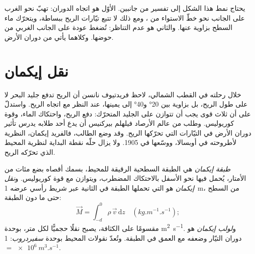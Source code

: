 يحتاج نمط هذا الشكل إلى تفسير من جانبين. الأوّل هو اتجاه الدوران: تهبّ  نحو الغرب على الجانب نحو خطّ الاستواء من ، ومع ذلك لا تتبع تيّارات  الريح ببساطة، ويتحرّك ماء السطح بزاوية عنها. والثاني هو عدم التناظر: تُضغط عودة  على الجانب الغربي من حوضها. وكلاهما يأتي من دوران الأرض.

\section{نقل إيكمان}\label{sec:b1:ocean-circulation:ekman}

\begin{history}
خلال رحلته في القطب الشمالي، لاحظ فريدتيوف نانسن أن الريح تدفع جليد البحر لا على طول الريح، بل بزاوية بين \ang{20} و\ang{40} إلى يمينها، عند النظر مع اتجاه الريح. واستدلّ على أن ثلاث قوى يجب أن تتوازن على الجليد المتحرّك: دفع الريح، واحتكاك الماء، وقوة كوريوليس. وطلب من عالم الأرصاد فيلهلم بيركنيس أن يدع أحد طلابه يدرس تأثير دوران الأرض في التيّارات التي تحرّكها الريح. وقد وضع الطالب، فالفريد إيكمان، النظرية لأطروحته في أوبسالا، ووسّعها في 1905. ولا يزال حلّه نقطة البداية لنظرية المحيط الذي تحرّكه الريح.
\end{history}

\begin{definition}\label{def:b1:ocean-circulation:ekman}
\emph{طبقة إيكمان} هي الطبقة السطحية الرقيقة للمحيط، بسمك أقصاه بضع مئات من الأمتار، يُحمل فيها  نحو الأسفل بالاحتكاك المضطرب، ويتوازن مع قوة كوريوليس. و\emph{نقل إيكمان} هو  التي تحملها الطبقة في الثانية عبر شريط رأسي عرضه \qty{1}{m}، من السطح حتى ما دون الطبقة:
\[
  \vec M = \int_{-d}^{0} \rho\,\vec v\,\mathrm dz \quad (\unit{kg.m^{-1}.s^{-1}});
\]
مقسومًا على الكثافة، يصبح نقلًا حجميًّا لكل متر، بوحدة \unit{m^2.s^{-1}}. و\emph{لولب إيكمان} هو دوران التيّار وضعفه مع العمق في الطبقة. وتُعدّ نقولات المحيط بوحدة \emph{سفيردروب}: \qty{1}{\sverdrup} $=
\qty{e6}{m^3.s^{-1}}$.
\end{definition}

